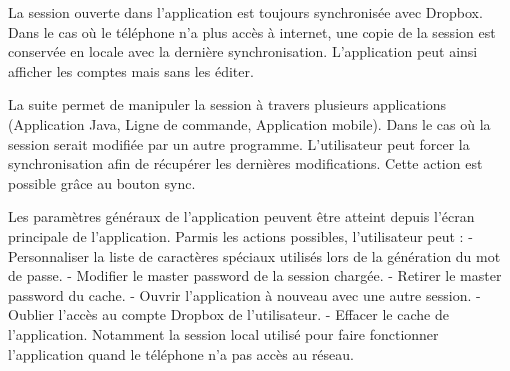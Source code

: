 
La session ouverte dans l'application est toujours synchronisée avec Dropbox. Dans le cas où le téléphone n'a plus accès à internet, une copie de la session est conservée en locale avec la dernière synchronisation. L'application peut ainsi afficher les comptes mais sans les éditer.


La suite \easypass{} permet de manipuler la session à travers plusieurs applications (Application Java, Ligne de commande, Application mobile). Dans le cas où la session serait modifiée par un autre programme. L'utilisateur peut forcer la synchronisation afin de récupérer les dernières modifications. Cette action est possible grâce au bouton sync.


Les paramètres généraux de l'application peuvent être atteint depuis l'écran principale de l'application. Parmis les actions possibles, l'utilisateur peut :
- Personnaliser la liste de caractères spéciaux utilisés lors de la génération du mot de passe. 
- Modifier le master password de la session chargée.
- Retirer le master password du cache.
- Ouvrir l'application à nouveau avec une autre session.
- Oublier l'accès au compte Dropbox de l'utilisateur.
- Effacer le cache de l'application. Notamment la session local utilisé pour faire fonctionner l'application quand le téléphone n'a pas accès au réseau.


